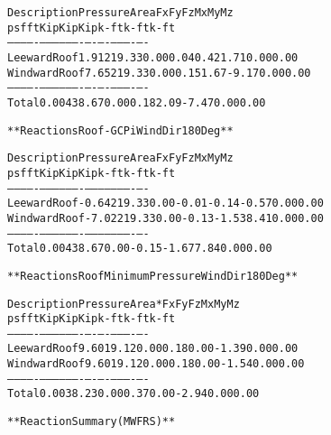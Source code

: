 \documentclass[12pt,notitle,letterpaper]{report}
\renewenvironment{quote}
  {\small\list{}{\rightmargin=0cm \leftmargin=0cm}%
   \item\relax}
  {\endlist}
\begin{document}
\begin{quote}
\begin{alltt}
          Description    Pressure    Area     Fx     Fy      Fz      Mx       My      Mz
                           psf        ft     Kip    Kip     Kip     k-ft     k-ft    k-ft
         -------------   --------   ------   ----   ----    ----    -----    ----    ----
         Leeward Roof        1.91   219.33   0.00   0.04    0.42     1.71    0.00    0.00
         Windward Roof       7.65   219.33   0.00   0.15    1.67    -9.17    0.00    0.00
         -------------   --------   ------   ----   ----    ----    -----    ----    ----
         Total               0.00   438.67   0.00   0.18    2.09    -7.47    0.00    0.00



**Reactions Roof -GCPi Wind Dir 180 Deg**



          Description    Pressure    Area     Fx     Fy      Fz      Mx       My      Mz
                           psf        ft     Kip     Kip     Kip    k-ft     k-ft    k-ft
         -------------   --------   ------   ----   -----   -----   -----    ----    ----
         Leeward Roof       -0.64   219.33   0.00   -0.01   -0.14   -0.57    0.00    0.00
         Windward Roof      -7.02   219.33   0.00   -0.13   -1.53    8.41    0.00    0.00
         -------------   --------   ------   ----   -----   -----   -----    ----    ----
         Total               0.00   438.67   0.00   -0.15   -1.67    7.84    0.00    0.00



**Reactions Roof Minimum Pressure Wind Dir 180 Deg**



          Description    Pressure   Area*    Fx      Fy      Fz      Mx       My      Mz
                           psf       ft     Kip     Kip     Kip     k-ft     k-ft    k-ft
         -------------   --------   -----   ----    ----    ----    -----    ----    ----
         Leeward Roof        9.60   19.12   0.00    0.18    0.00    -1.39    0.00    0.00
         Windward Roof       9.60   19.12   0.00    0.18    0.00    -1.54    0.00    0.00
         -------------   --------   -----   ----    ----    ----    -----    ----    ----
         Total               0.00   38.23   0.00    0.37    0.00    -2.94    0.00    0.00



**Reaction Summary (MWFRS)**




\end{alltt}
\end{quote}
\end{document}
